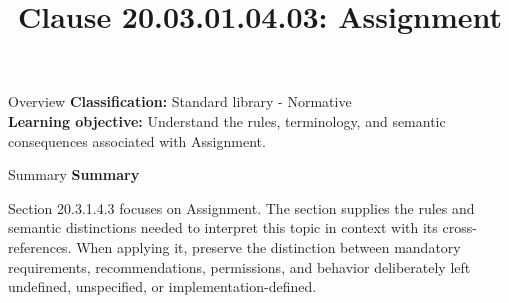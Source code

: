 \documentclass[10pt,letterpaper]{article}
\title{Clause 20.03.01.04.03: Assignment}
\author{}
\date{}
\begin{document}
\maketitle
\begin{CornellOverviewBox}{Overview}
\textbf{Classification:} Standard library - Normative\\[2pt]
\textbf{Learning objective:} Understand the rules, terminology, and semantic consequences associated with Assignment.
\end{CornellOverviewBox}\begin{CornellSummaryBox}{Summary}
{\sffamily\bfseries\color{Accent} Summary}\par\vspace{3pt}Section 20.3.1.4.3 focuses on Assignment. The section supplies the rules and semantic distinctions needed to interpret this topic in context with its cross-references. When applying it, preserve the distinction between mandatory requirements, recommendations, permissions, and behavior deliberately left undefined, unspecified, or implementation-defined.
\end{CornellSummaryBox}
\end{document}
